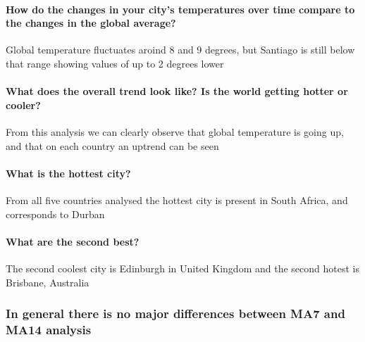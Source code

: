 \documentclass[11pt]{article}
\begin{document}
    \hypertarget{how-do-the-changes-in-your-citys-temperatures-over-time-compare-to-the-changes-in-the-global-average}{%
\paragraph{How do the changes in your city's temperatures over time
compare to the changes in the global
average?}\label{how-do-the-changes-in-your-citys-temperatures-over-time-compare-to-the-changes-in-the-global-average}}

    Global temperature fluctuates aroind 8 and 9 degrees, but Santiago is
still below that range showing values of up to 2 degrees lower

    \hypertarget{what-does-the-overall-trend-look-like-is-the-world-getting-hotter-or-cooler}{%
\paragraph{What does the overall trend look like? Is the world getting
hotter or
cooler?}\label{what-does-the-overall-trend-look-like-is-the-world-getting-hotter-or-cooler}}

    From this analysis we can clearly observe that global temperature is
going up, and that on each country an uptrend can be seen

    \hypertarget{what-is-the-hottest-city}{%
\paragraph{What is the hottest city?}\label{what-is-the-hottest-city}}

    From all five countries analysed the hottest city is present in South
Africa, and corresponds to Durban

    \hypertarget{what-are-the-second-best}{%
\paragraph{What are the second best?}\label{what-are-the-second-best}}

    The second coolest city is Edinburgh in United Kingdom and the second
hotest is Brisbane, Australia

    \hypertarget{in-general-there-is-no-major-differences-between-ma7-and-ma14-analysis}{%
\subsubsection{In general there is no major differences between MA7 and
MA14
analysis}\label{in-general-there-is-no-major-differences-between-ma7-and-ma14-analysis}}


    
    
    
\end{document}
